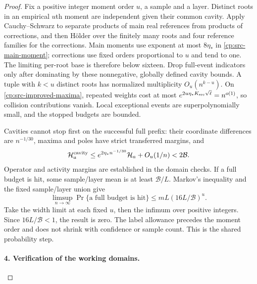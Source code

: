 \begin{proof}
Fix a positive integer moment order \(u\), a sample and a layer.
Distinct roots in an empirical \(u\)th moment are independent given
their common cavity.  Apply Cauchy--Schwarz to separate products of
main real references from products of corrections, and then H\"older
over the finitely many roots and four reference families for the
corrections.  Main moments use exponent at most \(8\eta_*\) in
\eqref{cp:src-main-moment}; corrections use fixed orders proportional
to \(u\) and tend to one.  The limiting per-root base is therefore
below sixteen.  Drop full-event indicators only after dominating by
these nonnegative, globally defined cavity bounds.  A tuple with
\(k<u\) distinct roots has normalized multiplicity
\(O_u(n^{k-u})\).  On \eqref{cp:src-improved-maxima}, repeated
weights cost at most \(e^{2u\eta_*K_{\rm src}\sqrt\ell}=n^{o(1)}\),
so collision contributions vanish.  Local exceptional events are
superpolynomially small, and the stopped budgets are bounded.

Cavities cannot stop first on the successful full prefix: their
coordinate differences are \(n^{-1/30}\), maxima and poles have
strict transferred margins, and
\[
 \mathcal H_a^{\rm cavity}\le
 e^{2\eta_*n^{-1/30}}\mathcal H_a+O_u(1/n)<2\mathcal B.
\]
Operator and activity margins are established in the domain checks.
If a full budget is hit, some sample/layer mean is at least
\(\mathcal B/L\).  Markov's inequality and the fixed sample/layer
union give
\begin{equation}
 \limsup_{n\to\infty}\Pr\{\text{a full budget is hit}\}
              \le mL(16L/\mathcal B)^u. \label{cp:src-budget-removal}
\end{equation}
Take the width limit at each fixed \(u\), then the infimum over
positive integers.  Since \(16L/\mathcal B<1\), the result is zero.
The label allowance precedes the moment order and does not shrink
with confidence or sample count.  This is the shared probability step.

\paragraph{4. Verification of the working domains.}


\end{proof}
